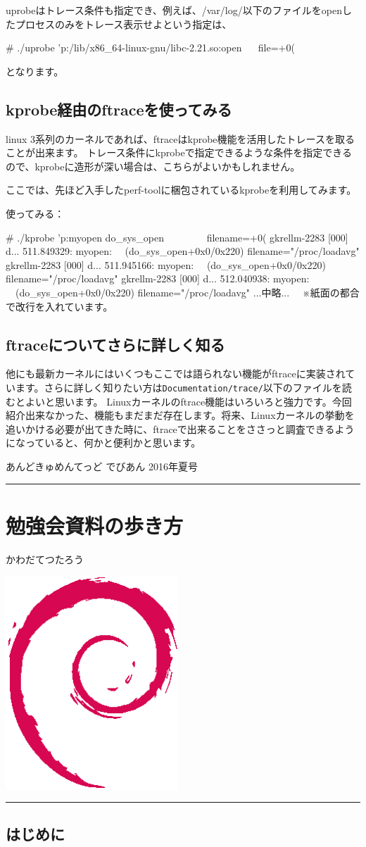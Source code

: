 \documentclass[mingoth,a4paper]{jsarticle}
\renewcommand{\dancersection}[2]{%
\newpage
あんどきゅめんてっど でびあん 2016年夏号
%
\vspace{0.1mm}\\
{\color{dancerdarkblue}\rule{\hsize}{2mm}}

%
%
\begin{minipage}[t]{0.6\hsize}
\color{dancerdarkblue}
\vspace{1cm}
\section{#1}
\hfill{}#2\\
\end{minipage}
\begin{minipage}[t]{0.4\hsize}
\vspace{-2cm}
\hfill{}\includegraphics[height=8cm]{image200502/openlogo-nd.eps}\\
\vspace{-5cm}
\end{minipage}
%
{\color{dancerlightblue}\rule{0.66\hsize}{2mm}}
%
\vspace{2cm}
}
\begin{document}
  
 uprobeはトレース条件も指定でき、例えば、/var/log/以下のファイルをopenしたプロセスのみをトレース表示せよという指定は、
\begin{commandline}
  # ./uprobe 'p:/lib/x86_64-linux-gnu/libc-2.21.so:open
  　 file=+0(%
\end{commandline}

となります。

  

\subsection{kprobe経由のftraceを使ってみる}

  linux 3系列のカーネルであれば、ftraceはkprobe機能を活用したトレースを取ることが出来ます。
トレース条件にkprobeで指定できるような条件を指定できるので、kprobeに造形が深い場合は、こちらがよいかもしれません。

  ここでは、先ほど入手したperf-toolに梱包されているkprobeを利用してみます。
  
  
  使ってみる：
\begin{commandline}
  # ./kprobe 'p:myopen do_sys_open
  　　　　filename=+0(%
  gkrellm-2283  [000] d...   511.849329: myopen:
  　(do_sys_open+0x0/0x220) filename="/proc/loadavg"
  gkrellm-2283  [000] d...   511.945166: myopen:
  　(do_sys_open+0x0/0x220) filename="/proc/loadavg"
  gkrellm-2283  [000] d...   512.040938: myopen:
  　(do_sys_open+0x0/0x220) filename="/proc/loadavg"
  ...中略...
　※紙面の都合で改行を入れています。
\end{commandline}  

  

\subsection{ftraceについてさらに詳しく知る}

 他にも最新カーネルにはいくつもここでは語られない機能がftraceに実装されています。さらに詳しく知りたい方は\verb+Documentation/trace/+以下のファイルを読むとよいと思います。
 Linuxカーネルのftrace機能はいろいろと強力です。今回紹介出来なかった、機能もまだまだ存在します。将来、Linuxカーネルの挙動を追いかける必要が出てきた時に、ftraceで出来ることをささっと調査できるようになっていると、何かと便利かと思います。

\dancersection{勉強会資料の歩き方}{かわだてつたろう}

\subsection{はじめに}
\end{document}
